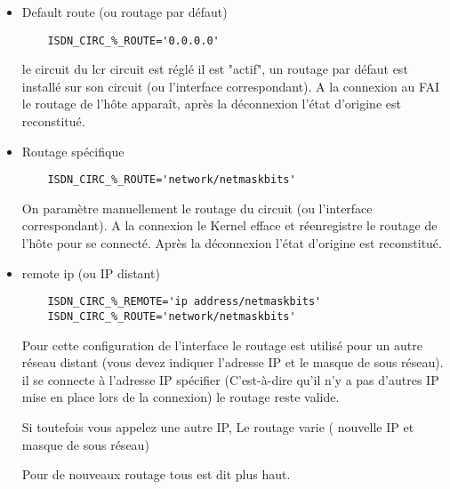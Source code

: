\begin{itemize}
\item Default route (ou routage par défaut)
  \begin{small}
\begin{example}
\begin{verbatim}
    ISDN_CIRC_%_ROUTE='0.0.0.0'
\end{verbatim}
\end{example}
  \end{small}
  
  le circuit du lcr circuit est réglé il est "actif", un routage par défaut 
  est installé sur son circuit (ou l'interface correspondant). A la 
  connexion au FAI le routage de l'hôte apparaît, après la déconnexion 
  l'état d'origine est reconstitué. 


  \item Routage spécifique
  \begin{small}
\begin{example}
\begin{verbatim}
    ISDN_CIRC_%_ROUTE='network/netmaskbits'
\end{verbatim}
\end{example}
  \end{small}
  
  On paramètre manuellement le routage du circuit (ou l'interface 
  correspondant). A la connexion le Kernel efface et réenregistre le 
  routage de l'hôte pour se connecté. Après la déconnexion l'état 
  d'origine est reconstitué.


  \item remote ip (ou IP distant)
  \begin{small}
\begin{example}
\begin{verbatim}
    ISDN_CIRC_%_REMOTE='ip address/netmaskbits'
    ISDN_CIRC_%_ROUTE='network/netmaskbits'
\end{verbatim}
\end{example}
  \end{small}
  
  Pour cette configuration de l'interface le routage est utilisé pour un 
  autre réseau distant (vous devez indiquer l'adresse IP et le masque de sous 
  réseau). il se connecte à l'adresse IP spécifier (C'est-à-dire qu'il n'y a 
  pas d'autres IP mise en place lors de la connexion) le routage reste valide.
  
  Si toutefois vous appelez une autre IP, Le routage varie 
  ( nouvelle IP et masque de sous réseau)
  
  Pour de nouveaux routage tous est dit plus haut.


\end{itemize}

